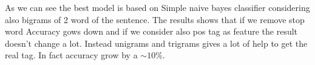 \documentclass[a4paper,8pt,oneside]{article}
\begin{document}
			As we can see the best model is based on Simple naive bayes classifier considering also bigrams of 2 word of the sentence. The results shows that if we remove stop word Accuracy gows down and if we consider also pos tag as feature the result doesn't change a lot. Instead unigrams and trigrams gives a lot of help to get the real tag. In fact accuracy grow by a $\sim 10\% $.
\end{document}
